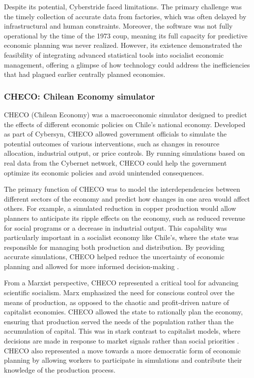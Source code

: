 \begin{refsection}
Despite its potential, Cyberstride faced limitations. The primary challenge was the timely collection of accurate data from factories, which was often delayed by infrastructural and human constraints. Moreover, the software was not fully operational by the time of the 1973 coup, meaning its full capacity for predictive economic planning was never realized. However, its existence demonstrated the feasibility of integrating advanced statistical tools into socialist economic management, offering a glimpse of how technology could address the inefficiencies that had plagued earlier centrally planned economies.

\subsubsection{CHECO: Chilean Economy simulator}

CHECO (Chilean Economy) was a macroeconomic simulator designed to predict the effects of different economic policies on Chile's national economy. Developed as part of Cybersyn, CHECO allowed government officials to simulate the potential outcomes of various interventions, such as changes in resource allocation, industrial output, or price controls. By running simulations based on real data from the Cybernet network, CHECO could help the government optimize its economic policies and avoid unintended consequences.

The primary function of CHECO was to model the interdependencies between different sectors of the economy and predict how changes in one area would affect others. For example, a simulated reduction in copper production would allow planners to anticipate its ripple effects on the economy, such as reduced revenue for social programs or a decrease in industrial output. This capability was particularly important in a socialist economy like Chile's, where the state was responsible for managing both production and distribution. By providing accurate simulations, CHECO helped reduce the uncertainty of economic planning and allowed for more informed decision-making \cite[pp.~91-95]{medina2014}.

From a Marxist perspective, CHECO represented a critical tool for advancing scientific socialism. Marx emphasized the need for conscious control over the means of production, as opposed to the chaotic and profit-driven nature of capitalist economies. CHECO allowed the state to rationally plan the economy, ensuring that production served the needs of the population rather than the accumulation of capital. This was in stark contrast to capitalist models, where decisions are made in response to market signals rather than social priorities \cite[pp.~731-734]{marx2008}. CHECO also represented a move towards a more democratic form of economic planning by allowing workers to participate in simulations and contribute their knowledge of the production process.


\end{refsection}
